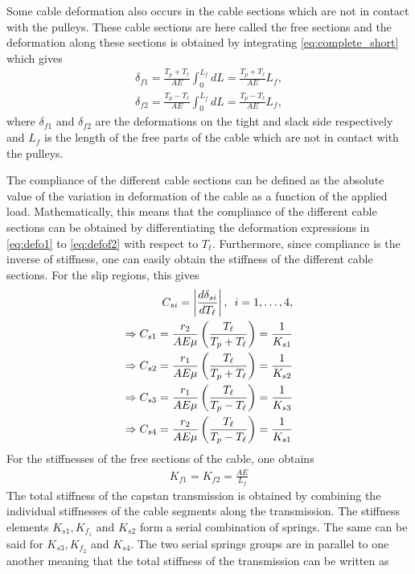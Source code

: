 Some cable deformation also occurs in the cable sections which are not in contact with the pulleys. These cable sections are here called the free sections and the deformation along these sections is obtained by integrating \eqref{eq:complete_short} which gives
\begin{align}
\delta_{f1} = \frac{T_p+T_\ell}{AE}\int_0^{L_f}dL=\frac{T_p+T_\ell}{AE}L_f,\label{eq:defof1}\\
\delta_{f2}=\frac{T_p-T_\ell}{AE}\int_0^{L_f}dL=\frac{T_p-T_\ell}{AE}L_f,\label{eq:defof2}
\end{align}
where $\delta_{f1}$ and $\delta_{f2}$ are the deformations on the tight and slack side respectively and $L_f$ is the length of the free parts of the cable which are not in contact with the pulleys.
\par
 The compliance of the different cable sections can be defined as the absolute value of the variation in deformation of the cable as a function of the applied load. Mathematically, this means that the compliance of the different cable sections can be obtained by differentiating the deformation expressions in \eqref{eq:defo1} to \eqref{eq:defof2} with respect to $T_\ell$. Furthermore, since compliance is the inverse of stiffness, one can easily obtain the stiffness of the different cable sections. For the slip regions, this gives
 \begin{align}
     C_{si}=\left|\frac{d\delta_{si}}{dT_\ell}\right|,\hquad i = 1,\ldots ,4,\label{eq:simple_stiff_1}\\
     \Rightarrow C_{s1} = \frac{r_2}{AE\mu}\left(\frac{T_\ell}{T_p+T_\ell}\right) = \frac{1}{K_{s1}}\\
     \Rightarrow C_{s2} = \frac{r_1}{AE\mu}\left(\frac{T_\ell}{T_p+T_\ell}\right)= \frac{1}{K_{s2}}\\
     \Rightarrow C_{s3} =
     \frac{r_1}{AE\mu}\left(\frac{T_\ell}{T_p-T_\ell}\right)= \frac{1}{K_{s3}}\\
     \Rightarrow C_{s4} =
     \frac{r_2}{AE\mu}\left(\frac{T_\ell}{T_p-T_\ell}\right)= \frac{1}{K_{s1}}\label{eq:simple_stiff_4}
 \end{align}
 For the stiffnesses of the free sections of the cable, one obtains
 \begin{align}
     K_{f1}=K_{f2}=\frac{AE}{L_f}
 \end{align}
 The total stiffness of the capstan transmission is obtained by combining the individual stiffnesses of the cable segments along the transmission. The stiffness elements $K_{s1},K_{f_1}$ and $K_{s2}$ form a serial combination of springs. The same can be said for $K_{s3},K_{f_2}$ and $K_{s4}$. The two serial springs groups are in parallel to one another meaning that the total stiffness of the transmission can be written as 
